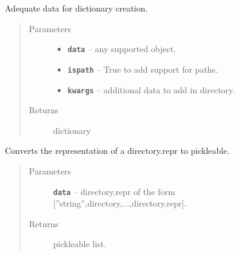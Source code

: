 \documentclass[letterpaper,10pt,english]{sphinxmanual}
\begin{document}
\begin{fulllineitems}
\begin{fulllineitems}
\begin{quote}
\begin{description}
\end{description}\end{quote}

\end{fulllineitems}


\begin{fulllineitems}
\label{RRtoolbox.lib:RRtoolbox.lib.directory.directory.filterdata}
Adequate data for dictionary creation.
\begin{quote}\begin{description}
\item[{Parameters}] \leavevmode\begin{itemize}
\item {} 
\textbf{\texttt{data}} -- any supported object.

\item {} 
\textbf{\texttt{ispath}} -- True to add support for paths.

\item {} 
\textbf{\texttt{kwargs}} -- additional data to add in directory.

\end{itemize}

\item[{Returns}] \leavevmode
dictionary

\end{description}\end{quote}

\end{fulllineitems}


\begin{fulllineitems}
\label{RRtoolbox.lib:RRtoolbox.lib.directory.directory.repr2list}
Converts the representation of a directory.repr to pickleable.
\begin{quote}\begin{description}
\item[{Parameters}] \leavevmode
\textbf{\texttt{data}} -- directory.repr of the form {[}''string'',directory,...,directory.repr{]}.

\item[{Returns}] \leavevmode
pickleable list.


\end{description}
\end{quote}
\end{fulllineitems}
\end{fulllineitems}
\end{document}
